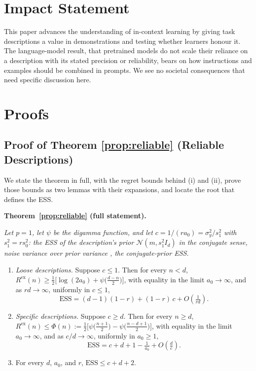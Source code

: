 \documentclass{article}
\newcommand{\ess}{\mathrm{ESS}}
\begin{document}
\section*{Impact Statement}
This paper advances the understanding of in-context learning by giving task descriptions a value in demonstrations and testing whether learners honour it. The language-model result, that pretrained models do not scale their reliance on a description with its stated precision or reliability, bears on how instructions and examples should be combined in prompts. We see no societal consequences that need specific discussion here.




\clearpage
\onecolumn
\appendix
\section{Proofs}

\subsection{Proof of Theorem \ref{prop:reliable} (Reliable Descriptions)}\label{app:specificity}
We state the theorem in full, with the regret bounds behind (i) and (ii), prove those bounds as two lemmas with their expansions, and locate the root that defines the ESS.

\medskip\noindent\textbf{Theorem~\ref{prop:reliable} (full statement).} {\itshape Let $p = 1$, let $\psi$ be the digamma function, and let $c = 1/(r a_0) = \sigma_y^2 / s_1^2$ with $s_1^2 = r s_0^2$: the ESS of the description's prior $\mathcal{N}(m, s_1^2 I_d)$ in the conjugate sense, noise variance over prior variance \citep{neuenschwander2020}, the conjugate-prior ESS.
\begin{enumerate}
\item[(i)] \emph{Loose descriptions.} Suppose $c \le 1$. Then for every $n < d$,
$R^{\mathrm{ex}}(n) \ge \tfrac12\big[\log(2a_0) + \psi\big(\tfrac{d-n}{2}\big)\big]$, with equality in the limit $a_0 \to \infty$, and as $rd \to \infty$, uniformly in $c \le 1$,
\[
\ess = (d-1)(1-r) + (1-r)\,c + O\!\left(\tfrac{1}{rd}\right).
\]
\item[(ii)] \emph{Specific descriptions.} Suppose $c \ge d$. Then for every $n \ge d$,
$R^{\mathrm{ex}}(n) \le \Phi(n) := \tfrac12\big[\psi\big(\tfrac{n+1}{2}\big) - \psi\big(\tfrac{n-d+1}{2}\big)\big]$, with equality in the limit $a_0 \to \infty$, and as $c/d \to \infty$, uniformly in $a_0 \ge 1$,
\[
\ess = c + d + 1 - \tfrac{1}{a_0} + O\!\left(\tfrac{d}{c}\right).
\]
\item[(iii)] For every $d$, $a_0$, and $r$, $\ess \le c + d + 2$.
\end{enumerate}}
\medskip
\end{document}
